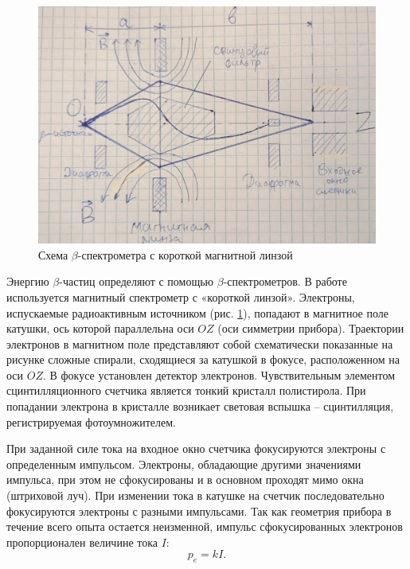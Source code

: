 	
	\begin{figure}[h!]
		\centering
		\includegraphics[width=\linewidth]{Pictures/Scheme}
		\caption{Схема $\beta$-спектрометра с короткой магнитной линзой}
		\label{BetaParticles_Scheme}
	\end{figure}

	Энергию $\beta$-частиц определяют с помощью $\beta$-спектрометров. В работе используется магнитный спектрометр с «короткой линзой». Электроны, испускаемые радиоактивным источником (рис. \ref{BetaParticles_Scheme}), попадают в магнитное поле катушки, ось которой параллельна оси $OZ$ (оси симметрии прибора). Траектории электронов в магнитном поле представляют собой схематически показанные на рисунке сложные спирали, сходящиеся за катушкой в фокусе, расположенном на оси $OZ$. В фокусе установлен детектор электронов. Чувствительным элементом сцинтилляционного счетчика является тонкий кристалл полистирола. При попадании электрона в кристалле возникает световая вспышка -- сцинтилляция, регистрируемая фотоумножителем.
	
	При заданной силе тока на входное окно счетчика фокусируются электроны с определенным импульсом. Электроны, обладающие другими значениями импульса, при этом не сфокусированы и в основном проходят мимо окна (штриховой луч). При изменении тока в катушке на счетчик последовательно фокусируются электроны с разными импульсами. Так как геометрия прибора в течение всего опыта остается неизменной, импульс сфокусированных электронов пропорционален величине тока $I$:
	\begin{equation}
		p_e = kI.
		\label{BetaParticles_pkI}
	\end{equation}


